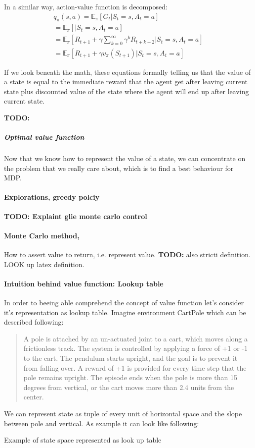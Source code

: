 In a similar way, action-value function is decomposed:
\begin{align*}
	q_{\pi}(s, a) = \mathbb{E}_{\pi} [G_t |S_t = s, A_t = a] \\
		= \mathbb{E}_{\pi} [ |S_t = s, A_t = a] \\
		= \mathbb{E}_{\pi} [R_{t+1} + \gamma \sum_{k=0}^{\infty} \gamma^k R_{t+k+2} |S_t = s, A_t = a] \\
		= \mathbb{E}_{\pi} [R_{t+1} + \gamma v_{\pi}(S_{t+1}) | S_t = s, A_t = a]
\end{align*}

If we look beneath the math, these equations formally telling us that the value of a state is equal to the
immediate reward that the agent get after leaving current state plus discounted value
of the state where the agent will end up after leaving current state.

\textbf{TODO:}
\subparagraph{Optimal value function} Now that we know how to represent the value of
a state, we can concentrate on the problem that we really care about, which
is to find a best behaviour for MDP.

\paragraph{Explorations, greedy polciy}

\textbf{TODO: Explaint glie monte carlo control}
\paragraph{Monte Carlo method,} How to assert value to return, i.e. represent value.
\textbf{TODO:} also stricti definition. LOOK up latex definition.

\paragraph{Intuition behind value function: Lookup table}
In order to beeing able comprehend the concept of value function let's consider
it's representation as lookup table. Imagine environment
CartPole which can be described following:





\blockquote{
	A pole is attached by an un-actuated joint to a cart, which moves along a
	frictionless track. The system is controlled by applying a force of +1 or -1
	to the cart. The pendulum starts upright, and the goal is to prevent it from
	falling over. A reward of +1 is provided for every time step that the pole remains
	upright. The episode ends when the pole is more than 15 degrees from vertical, or the
	cart moves more than 2.4 units from the center.
}
We can represent state as tuple of every unit of horizontal space and
the slope between pole and vertical. As example it can look like following:
\begin{table}
	\caption{Example of state space represented as look up table}
	\label{}

\end{table}

